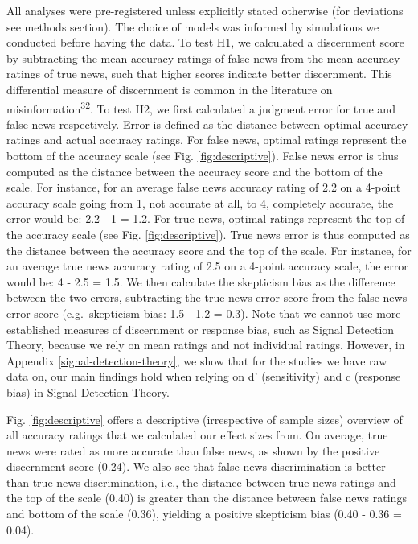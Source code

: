 \documentclass[
  man]{apa6}
\begin{document}
All analyses were pre-registered unless explicitly stated otherwise (for deviations see methods section). The choice of models was informed by simulations we conducted before having the data. To test H1, we calculated a discernment score by subtracting the mean accuracy ratings of false news from the mean accuracy ratings of true news, such that higher scores indicate better discernment. This differential measure of discernment is common in the literature on misinformation\textsuperscript{32}. To test H2, we first calculated a judgment error for true and false news respectively. Error is defined as the distance between optimal accuracy ratings and actual accuracy ratings. For false news, optimal ratings represent the bottom of the accuracy scale (see Fig. \ref{fig:descriptive}). False news error is thus computed as the distance between the accuracy score and the bottom of the scale. For instance, for an average false news accuracy rating of 2.2 on a 4-point accuracy scale going from 1, not accurate at all, to 4, completely accurate, the error would be: 2.2 - 1 = 1.2. For true news, optimal ratings represent the top of the accuracy scale (see Fig. \ref{fig:descriptive}). True news error is thus computed as the distance between the accuracy score and the top of the scale. For instance, for an average true news accuracy rating of 2.5 on a 4-point accuracy scale, the error would be: 4 - 2.5 = 1.5. We then calculate the skepticism bias as the difference between the two errors, subtracting the true news error score from the false news error score (e.g.~skepticism bias: 1.5 - 1.2 = 0.3). Note that we cannot use more established measures of discernment or response bias, such as Signal Detection Theory, because we rely on mean ratings and not individual ratings. However, in Appendix \ref{signal-detection-theory}, we show that for the studies we have raw data on, our main findings hold when relying on d' (sensitivity) and c (response bias) in Signal Detection Theory.

Fig. \ref{fig:descriptive} offers a descriptive (irrespective of sample sizes) overview of all accuracy ratings that we calculated our effect sizes from. On average, true news were rated as more accurate than false news, as shown by the positive discernment score (0.24). We also see that false news discrimination is better than true news discrimination, i.e., the distance between true news ratings and the top of the scale (0.40) is greater than the distance between false news ratings and bottom of the scale (0.36), yielding a positive skepticism bias (0.40 - 0.36 = 0.04).
\end{document}
